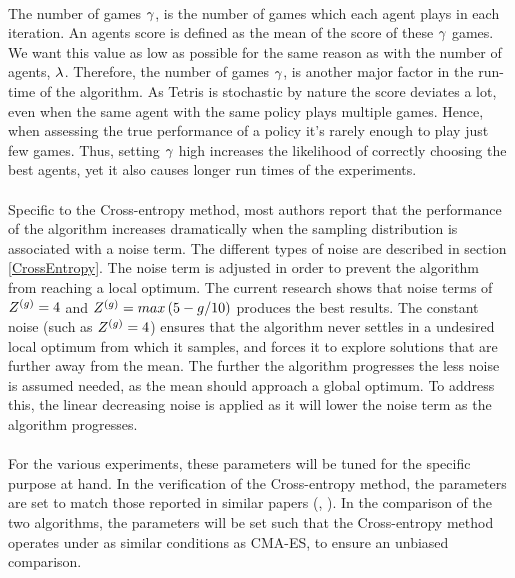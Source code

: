\\
The number of games $\gamma$, 
is the number of games  which each agent 
plays in each iteration. An agents score is defined as the 
mean of the score of these 
$\gamma$ games.
We want this value as low as possible for the same reason as with the number of
agents, $\lambda$. Therefore, the number of games $\gamma$, 
is another major factor in the run-time of the algorithm.
As Tetris is stochastic by nature the score deviates a lot, 
even when the
same agent with the same policy plays multiple games. 
Hence, when assessing the true
performance of a policy it's rarely enough to play just few games. Thus, setting 
$\gamma$ high increases the likelihood of correctly choosing the best 
agents, yet it also causes longer run times of the experiments.\\
\\
Specific to the Cross-entropy method, 
most authors report that the performance of the 
algorithm increases dramatically when the sampling 
distribution is associated with
a noise term. The different types of 
noise are described in section \ref{CrossEntropy}.
The noise term is adjusted in order to 
prevent the algorithm from reaching a local optimum.
The current research shows that noise terms of $Z^{(g)} = 4$ and 
$Z^{(g)} = max \left( 5 - g / 10 \right)$ 
\citep{scherrer2009} produces the best results.
The constant noise (such as $Z^{(g)} = 4$) ensures that the algorithm
never settles in a undesired local optimum from which it samples, and forces it to explore
solutions that are further away from the mean. The further the 
algorithm progresses 
the less noise is assumed needed, as the mean should approach a global optimum. To
address this, the linear decreasing noise 
is applied as it will lower the noise term
as the algorithm progresses.\\
\\
For the various experiments, these 
parameters will be tuned for the specific purpose 
at hand. In the verification of the Cross-entropy method, the parameters are set 
to match those reported in similar papers (\cite{scherrer2009}, \cite{szita:06}).
In the comparison of the two algorithms, the parameters will be set such that 
the Cross-entropy method operates under as 
similar conditions as CMA-ES, to ensure an unbiased
comparison.





